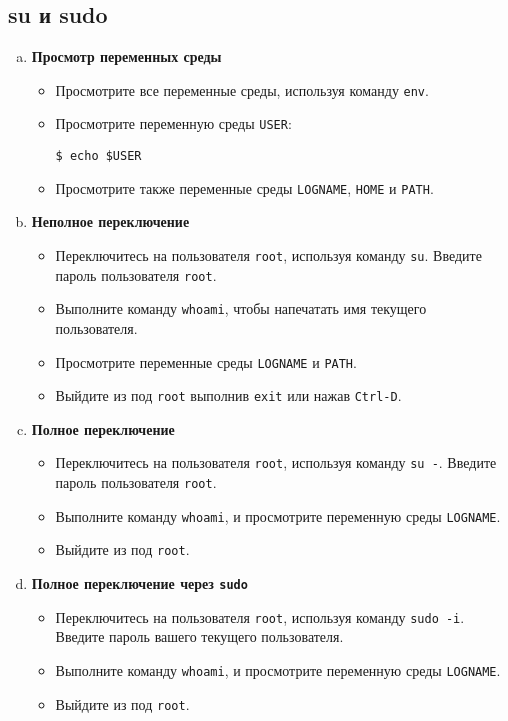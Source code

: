 \documentclass{article}
\begin{document}
\subsection{su и sudo}
\begin{enumerate}[a.]

\item \textbf{Просмотр переменных среды}
\begin{itemize}
\item Просмотрите все переменные среды, используя команду \texttt{env}.
\item Просмотрите переменную среды \texttt{USER}:
\begin{lstlisting}
$ echo $USER
\end{lstlisting}
\item Просмотрите также переменные среды \texttt{LOGNAME}, \texttt{HOME} и \texttt{PATH}.
\end{itemize}

\item \textbf{Неполное переключение}
\begin{itemize}
\item Переключитесь на пользователя \texttt{root}, используя команду \texttt{su}.
Введите пароль пользователя \texttt{root}.
\item Выполните команду \texttt{whoami}, чтобы напечатать имя текущего пользователя.
\item Просмотрите переменные среды \texttt{LOGNAME} и \texttt{PATH}.
\item Выйдите из под \texttt{root} выполнив \texttt{exit} или нажав \texttt{Ctrl-D}.
\end{itemize}

\item \textbf{Полное переключение}
\begin{itemize}
\item Переключитесь на пользователя \texttt{root}, используя команду \texttt{su -}.
Введите пароль пользователя \texttt{root}.
\item Выполните команду \texttt{whoami}, и просмотрите переменную среды \texttt{LOGNAME}.
\item Выйдите из под \texttt{root}.
\end{itemize}

\item \textbf{Полное переключение через \texttt{sudo}}
\begin{itemize}
\item Переключитесь на пользователя \texttt{root}, используя команду \texttt{sudo -i}.
Введите пароль вашего текущего пользователя.
\item Выполните команду \texttt{whoami}, и просмотрите переменную среды \texttt{LOGNAME}.
\item Выйдите из под \texttt{root}.
\end{itemize}


\end{enumerate}
\end{document}
